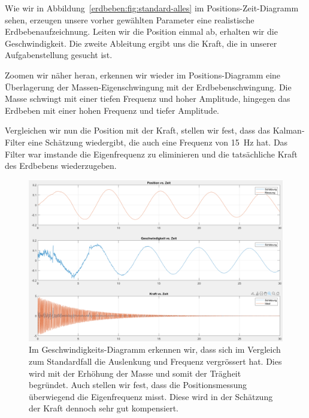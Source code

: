 Wie wir in Abbildung~\ref{erdbeben:fig:standard-alles} im Positions-Zeit-Diagramm sehen, erzeugen unsere vorher gewählten Parameter eine realistische Erdbebenaufzeichnung.
Leiten wir die Position einmal ab, erhalten wir die Geschwindigkeit.
Die zweite Ableitung ergibt uns die Kraft, die in unserer Aufgabenstellung gesucht ist.

Zoomen wir näher heran, erkennen wir wieder im Positions-Diagramm eine Überlagerung der Massen-Eigenschwingung mit der Erdbebenschwingung.
Die Masse schwingt mit einer tiefen Frequenz und hoher Amplitude, hingegen das Erdbeben mit einer hohen Frequenz und tiefer Amplitude.

Vergleichen wir nun die Position mit der Kraft, stellen wir fest, dass das Kalman-Filter eine Schätzung wiedergibt, die auch eine Frequenz von \SI{15}{\hertz} hat.
Das Filter war imstande die Eigenfrequenz zu eliminieren und die tatsächliche Kraft des Erdbebens wiederzugeben.

\begin{figure}
  \begin{center}
    \includegraphics[width=\linewidth,keepaspectratio]{papers/erdbeben/Systemparameter_geaendert.PNG}
      \caption{
        Im Geschwindigkeits-Diagramm erkennen wir,
        dass sich im Vergleich zum Standardfall die Auslenkung und Frequenz vergrössert hat.
        Dies wird mit der Erhöhung der Masse und somit der Trägheit begründet.
        Auch stellen wir fest, dass die Positionsmessung überwiegend die Eigenfrequenz misst.
        Diese wird in der Schätzung der Kraft dennoch sehr gut kompensiert.
      }
    \label{erdbeben:fig:systemparameter-geaendert}
  \end{center}
\end{figure}

